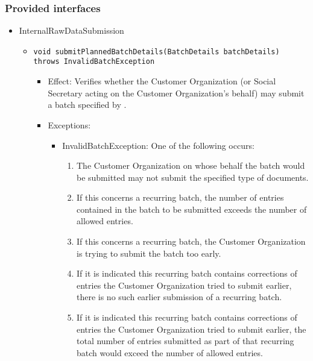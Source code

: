 \subsubsection*{Provided interfaces}
\begin{itemize}
	\item InternalRawDataSubmission
	\begin{itemize}
		\item \texttt{void submitPlannedBatchDetails(BatchDetails batchDetails) throws InvalidBatchException}
		\begin{itemize}
			\item Effect: Verifies whether the Customer Organization (or Social Secretary acting on the Customer Organization's behalf) may submit a batch specified by .
			\item Exceptions:
			\begin{itemize}
				\item InvalidBatchException: One of the following occurs:
				\begin{enumerate}
					\item The Customer Organization on whose behalf the batch would be submitted may not submit the specified type of documents.
					\item If this concerns a recurring batch, the number of entries contained in the batch to be submitted exceeds the number of allowed entries.
					\item If this concerns a recurring batch, the Customer Organization is trying to submit the batch too early.
					\item If it is indicated this recurring batch contains corrections of entries the Customer Organization tried to submit earlier, there is no such earlier submission of a recurring batch.
					\item If it is indicated this recurring batch contains corrections of entries the Customer Organization tried to submit earlier, the total number of entries submitted as part of that recurring batch would exceed the number of allowed entries.
				\end{enumerate}
			\end{itemize}
		\end{itemize}
		

\end{itemize}
\end{itemize}

